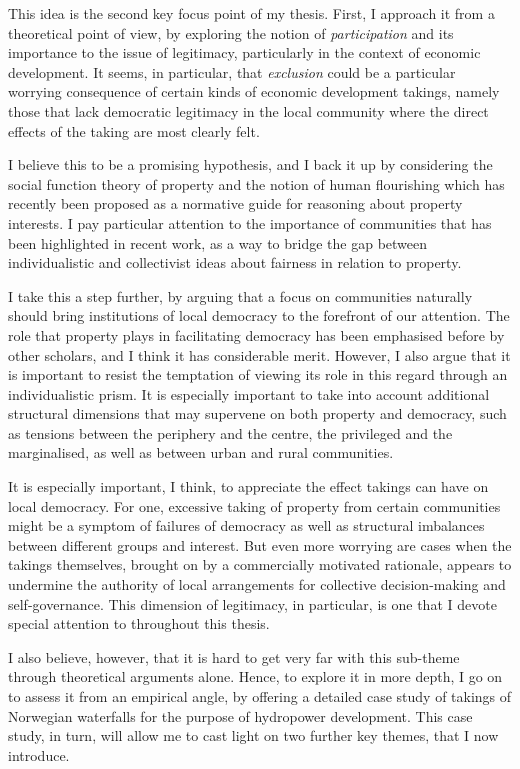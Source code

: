 This idea is the second key focus point of my thesis. First, I approach it from a theoretical point of view, by exploring the notion of {\it participation} and its importance to the issue of legitimacy, particularly in the context of economic development. It seems, in particular, that {\it exclusion} could be a particular worrying consequence of certain kinds of economic development takings, namely those that lack democratic legitimacy in the local community where the direct effects of the taking are most clearly felt.

I believe this to be a promising hypothesis, and I back it up by considering the social function theory of property and the notion of human flourishing which has recently been proposed as a normative guide for reasoning about property interests. I pay particular attention to the importance of communities that has been highlighted in recent work, as a way to bridge the gap between individualistic and collectivist ideas about fairness in relation to property.

I take this a step further, by arguing that a focus on communities naturally should bring institutions of local democracy to the forefront of our attention. The role that property plays in facilitating democracy has been emphasised before by other scholars, and I think it has considerable merit. However, I also argue that it is important to resist the temptation of viewing its role in this regard through an individualistic prism. It is especially important to take into account additional structural dimensions that may supervene on both property and democracy, such as tensions between the periphery and the centre, the privileged and the marginalised, as well as between urban and rural communities.

It is especially important, I think, to appreciate the effect takings can have on local democracy. For one, excessive taking of property from certain communities might be a symptom of failures of democracy as well as structural imbalances between different groups and interest. But even more worrying are cases when the takings themselves, brought on by a commercially motivated rationale, appears to undermine the authority of local arrangements for collective decision-making and self-governance. This dimension of legitimacy, in particular, is one that I devote special attention to throughout this thesis.

I also believe, however, that it is hard to get very far with this sub-theme through theoretical arguments alone. Hence, to explore it in more depth, I go on to assess it from an empirical angle, by offering a detailed case study of takings of Norwegian waterfalls for the purpose of hydropower development. This case study, in turn, will allow me to cast light on two further key themes, that I now introduce. %

